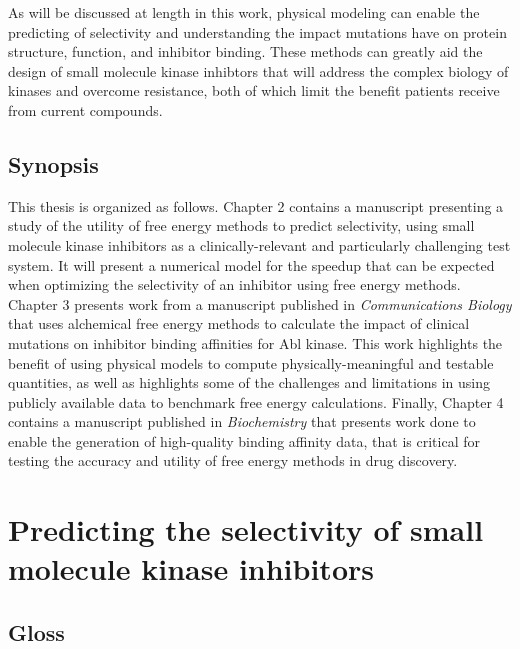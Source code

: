 \documentclass[phd,tocprelim]{cornell}
\begin{document}
As will be discussed at length in this work, physical modeling can enable the predicting of selectivity and understanding the impact mutations have on protein structure, function, and inhibitor binding. These methods can greatly aid the design of small molecule kinase inhibtors that will address the complex biology of kinases and overcome resistance, both of which limit the benefit patients receive from current compounds. 

 \section{Synopsis}
 This thesis is organized as follows. Chapter 2 contains a manuscript presenting a study of the utility of free energy methods to predict selectivity, using small molecule kinase inhibitors as a clinically-relevant and particularly challenging test system. It will present a numerical model for the speedup that can be expected when optimizing the selectivity of an inhibitor using free energy methods.  Chapter 3  presents work from a manuscript published in \emph{Communications Biology} that uses alchemical free energy methods to calculate the impact of clinical mutations on inhibitor binding affinities for Abl kinase. This work highlights the benefit of using physical models to compute physically-meaningful and testable quantities, as well as highlights some of the challenges and limitations in using publicly available data to benchmark free energy calculations. Finally, Chapter 4 contains a manuscript published in \emph{Biochemistry} that presents work done to enable the generation of high-quality binding affinity data, that is critical for testing the accuracy and utility of free energy methods in drug discovery. 
 
 
 
\chapter{Predicting the selectivity of small molecule kinase inhibitors}

\section{Gloss}
\end{document}
